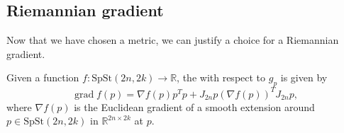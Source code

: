 \subsection{Riemannian gradient}
Now that we have chosen a metric, we can justify a choice for a Riemannian gradient. 
\begin{proposition}
    Given a function $f:\mathrm{SpSt}(2n, 2k)\xrightarrow{}\mathbb{R}$, the  with respect to $g_{p}$ is given by
    \begin{equation}\label{eq:rie_grad}
        \operatorname{grad}f(p)=\nabla f(p)p^{T}p+J_{2n}p(\nabla f(p))^{T}J_{2n}p,
    \end{equation}
    where $\nabla f(p)$ is the Euclidean gradient of a smooth extension around $p\in \mathrm{SpSt}(2n, 2k)$ in $\mathbb{R}^{2n\times2k}$ at $p$.
\end{proposition}
